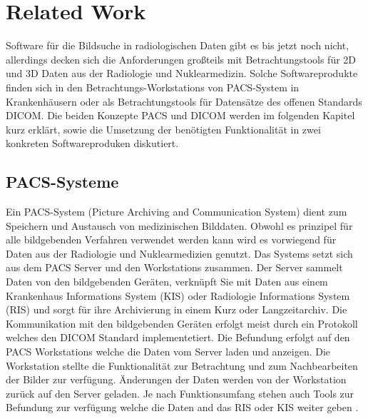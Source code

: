 \section{Related Work}
\label{sec:relatedWork}
Software für die Bildsuche in radiologischen Daten gibt es bis jetzt noch nicht, 
allerdings decken sich die Anforderungen großteils mit Betrachtungstools für 2D und 3D Daten aus der Radiologie und Nuklearmedizin.
Solche Softwareprodukte finden sich in den Betrachtungs-Workstations von PACS-System in Krankenhäusern oder als Betrachtungstools für Datensätze des offenen Standards DICOM.
Die beiden Konzepte PACS und DICOM werden im folgenden Kapitel kurz erklärt, sowie die Umsetzung der benötigten Funktionalität in zwei konkreten Softwareproduken diskutiert.

\subsection{PACS-Systeme}
\label{sec:PACS-Systeme}
Ein PACS-System (Picture Archiving and Communication System) dient zum Speichern und Austausch von medizinischen Bilddaten.
Obwohl es prinzipel für alle bildgebenden Verfahren verwendet werden kann wird es vorwiegend für Daten aus der Radiologie und Nuklearmedizien genutzt.
%
Das Systems setzt sich aus dem PACS Server und den Workstations zusammen.
Der Server sammelt Daten von den bildgebenden Geräten,
 verknüpft Sie mit Daten aus einem Krankenhaus Informations System (KIS) oder Radiologie Informations System (RIS) und sorgt für ihre Archivierung in einem Kurz oder Langzeitarchiv. 
Die Kommunikation mit den bildgebenden Geräten erfolgt meist durch ein Protokoll welches den DICOM Standard implementetiert.
%
Die Befundung erfolgt auf den PACS Workstations welche die Daten vom Server laden und anzeigen.
Die Workstation stellte die Funktionalität zur Betrachtung und zum Nachbearbeiten der Bilder zur verfügung.
Änderungen der Daten werden von der Workstation zurück auf den Server geladen.
Je nach Funktionsumfang stehen auch Tools zur Befundung zur verfügung welche die Daten and das RIS oder KIS weiter geben \cite{pacs}.


